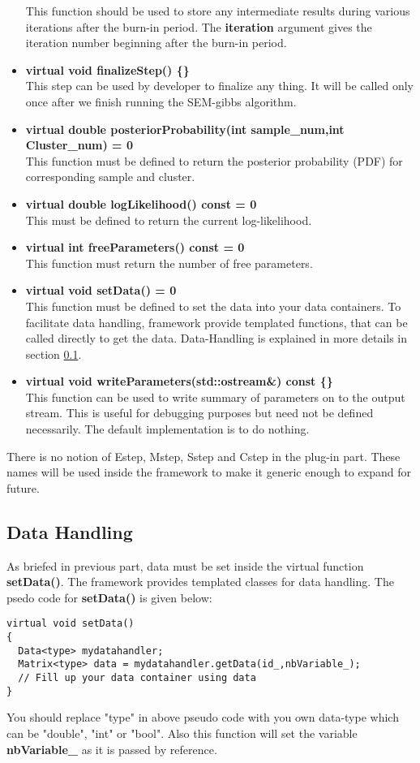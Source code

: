 \documentclass[a4paper,11pt]{article}
\begin{document}
\begin{itemize}
This function should be used to store any intermediate results during various iterations after the burn-in period. The {\bf iteration} argument gives the 
iteration number beginning after the burn-in period.
\item {\bf virtual void finalizeStep() \{\}}\\
This step can be used by developer to finalize any thing. It will be called only once after we
finish running the SEM-gibbs algorithm.
\item {\bf virtual double posteriorProbability(int sample\_num,int Cluster\_num) = 0}\\
This function must be defined to return the posterior probability (PDF) for corresponding sample and cluster.
\item {\bf virtual double logLikelihood() const = 0}\\
This must be defined to return the current log-likelihood.
\item {\bf virtual int freeParameters() const = 0}\\
This function must return the number of free parameters.
\item {\bf virtual void setData() = 0}\\
This function must be defined to set the data into your data containers. To facilitate data handling, framework provide templated functions,
that can be called directly to get the data. Data-Handling is explained in more details in section \ref{datahandling}.
\item {\bf virtual void writeParameters(std::ostream\&) const \{\}}\\
This function can be used to write summary of parameters on to the output stream. This is useful for debugging purposes but need not be defined necessarily. The
default implementation is to do nothing.
\end{itemize}

There is no notion of Estep, Mstep, Sstep and Cstep in the plug-in part. These names will be used inside the framework to make
it generic enough to expand for future. 

\subsection{Data Handling}
\label{datahandling}
As briefed in previous part, data must be set inside the virtual function {\bf setData()}. The framework provides templated classes for data handling. The 
psedo code for {\bf setData()} is given below:
\begin{lstlisting}
virtual void setData()
{
  Data<type> mydatahandler;
  Matrix<type> data = mydatahandler.getData(id_,nbVariable_);
  // Fill up your data container using data 
}
\end{lstlisting}
You should replace "type" in above pseudo code with you own data-type which can be {"double", "int" or "bool"}. Also this function will set 
the variable {\bf nbVariable\_} as it is passed by reference.
\end{document}
